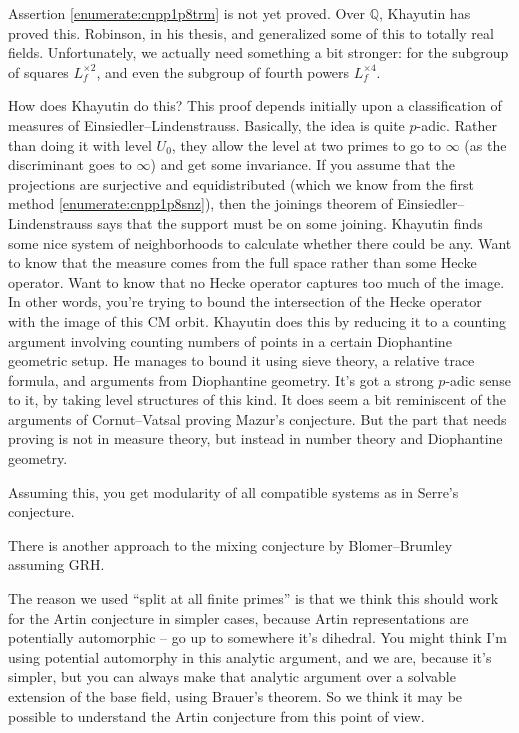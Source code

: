 \documentclass[reqno]{amsart} 
\begin{document}
Assertion \eqref{enumerate:cnpp1p8trm} is not yet proved.  Over $\mathbb{Q}$, Khayutin  has proved this.  Robinson, in his thesis, and generalized some of this to totally real fields.  Unfortunately, we actually need something a bit stronger: for the subgroup of squares $L_f^{\times 2} $, and even the subgroup of fourth powers $L_f^{\times 4}$.

How does Khayutin do this?  This proof depends initially upon a classification of measures of Einsiedler--Lindenstrauss.  Basically, the idea is quite $p$-adic.  Rather than doing it with level $U_0$, they allow the level at two primes to go to $\infty$ (as the discriminant goes to $\infty$) and get some invariance.  If you assume that the projections are surjective and equidistributed (which we know from the first method \eqref{enumerate:cnpp1p8snz}), then the joinings theorem of Einsiedler--Lindenstrauss says that the support must be on some joining.  Khayutin finds some nice system of neighborhoods to calculate whether there could be any.  Want to know that the measure comes from the full space rather than some Hecke operator.  Want to know that no Hecke operator captures too much of the image.  In other words, you're trying to bound the intersection of the Hecke operator with the image of this CM orbit.  Khayutin does this by reducing it to a counting argument involving counting numbers of points in a certain Diophantine geometric setup.  He manages to bound it using sieve theory, a relative trace formula, and arguments from Diophantine geometry.  It's got a strong $p$-adic sense to it, by taking level structures of this kind.  It does seem a bit reminiscent of the arguments of Cornut--Vatsal proving Mazur's conjecture.  But the part that needs proving is not in measure theory, but instead in number theory and Diophantine geometry.

Assuming this, you get modularity of all compatible systems as in Serre's conjecture.

\begin{remark}
  There is another approach to the mixing conjecture by Blomer--Brumley assuming GRH.
\end{remark}

\begin{remark}
  The reason we used ``split at all finite primes'' is that we think this should work for the Artin conjecture in simpler cases, because Artin representations are potentially automorphic -- go up to somewhere it's dihedral.  You might think I'm using potential automorphy in this analytic argument, and we are, because it's simpler, but you can always make that analytic argument over a solvable extension of the base field, using Brauer's theorem.  So we think it may be possible to understand the Artin conjecture from this point of view.
\end{remark}
\end{document}
